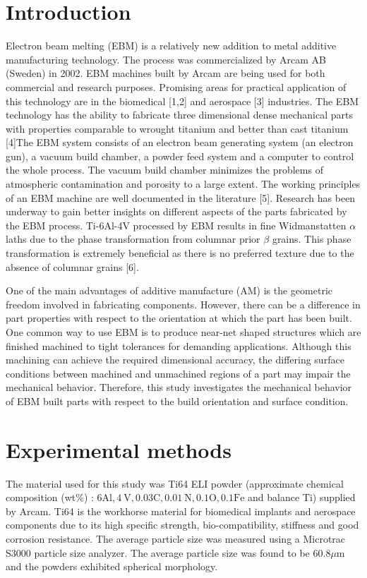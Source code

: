 \documentclass[10pt]{article}
\begin{document}
\section*{Introduction}
Electron beam melting (EBM) is a relatively new addition to metal additive manufacturing technology. The process was commercialized by Arcam AB (Sweden) in 2002. EBM machines built by Arcam are being used for both commercial and research purposes. Promising areas for practical application of this technology are in the biomedical [1,2] and aerospace [3] industries. The EBM technology has the ability to fabricate three dimensional dense mechanical parts with properties comparable to wrought titanium and better than cast titanium [4]The EBM system consists of an electron beam generating system (an electron gun), a vacuum build chamber, a powder feed system and a computer to control the whole process. The vacuum build chamber minimizes the problems of atmospheric contamination and porosity to a large extent. The working principles of an EBM machine are well documented in the literature [5]. Research has been underway to gain better insights on different aspects of the parts fabricated by the EBM process. Ti-6Al-4V processed by EBM results in fine Widmanstatten $\alpha$ laths due to the phase transformation from columnar prior $\beta$ grains. This phase transformation is extremely beneficial as there is no preferred texture due to the absence of columnar grains [6].

One of the main advantages of additive manufacture (AM) is the geometric freedom involved in fabricating components. However, there can be a difference in part properties with respect to the orientation at which the part has been built. One common way to use EBM is to produce near-net shaped structures which are finished machined to tight tolerances for demanding applications. Although this machining can achieve the required dimensional accuracy, the differing surface conditions between machined and unmachined regions of a part may impair the mechanical behavior. Therefore, this study investigates the mechanical behavior of EBM built parts with respect to the build orientation and surface condition.

\section*{Experimental methods}
The material used for this study was Ti64 ELI powder (approximate chemical composition (wt\%) : $6 \mathrm{Al}, 4 \mathrm{~V}, 0.03 \mathrm{C}, 0.01 \mathrm{~N}, 0.1 \mathrm{O}, 0.1 \mathrm{Fe}$ and balance Ti) supplied by Arcam. Ti64 is the workhorse material for biomedical implants and aerospace components due to its high specific strength, bio-compatibility, stiffness and good corrosion resistance. The average particle size was measured using a Microtrac S3000 particle size analyzer. The average particle size was found to be $60.8 \mu \mathrm{m}$ and the powders exhibited spherical morphology.
\end{document}
